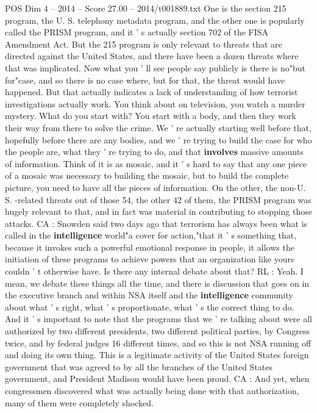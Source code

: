 \begin{textsample}{POS Dim 4 – 2014 – Score 27.00 – 2014/t001889.txt}
One is the section 215 program, the U.
S. telephony metadata program, and the other one is popularly called the PRISM program, and it ' s actually section 702 of the FISA Amendment Act.
But the 215 program is only relevant to threats that are directed against the United States, and there have been a dozen threats where that was implicated.
Now what you ' ll see people say publicly is there is no"but for"case, and so there is no case where, but for that, the threat would have happened.
But that actually indicates a lack of understanding of how terrorist investigations actually work.
You think about on television, you watch a murder mystery.
What do you start with?
You start with a body, and then they work their way from there to solve the crime.
We ' re actually starting well before that, hopefully before there are any bodies, and we ' re trying to build the case for who the people are, what they ' re trying to do, and that \textbf{involves} massive amounts of information.
Think of it is as mosaic, and it ' s hard to say that any one piece of a mosaic was necessary to building the mosaic, but to build the complete picture, you need to have all the pieces of information.
On the other, the non-U.
S. -related threats out of those 54, the other 42 of them, the PRISM program was hugely relevant to that, and in fact was material in contributing to stopping those attacks.
CA : Snowden said two days ago that terrorism has always been what is called in the \textbf{intelligence} world"a cover for action,"that it ' s something that, because it invokes such a powerful emotional response in people, it allows the initiation of these programs to achieve powers that an organization like yours couldn ' t otherwise have.
Is there any internal debate about that?
RL : Yeah.
I mean, we debate these things all the time, and there is discussion that goes on in the executive branch and within NSA itself and the \textbf{intelligence} community about what ' s right, what ' s proportionate, what ' s the correct thing to do.
And it ' s important to note that the programs that we ' re talking about were all authorized by two different presidents, two different political parties, by Congress twice, and by federal judges 16 different times, and so this is not NSA running off and doing its own thing.
This is a legitimate activity of the United States foreign government that was agreed to by all the branches of the United States government, and President Madison would have been proud.
CA : And yet, when congressmen discovered what was actually being done with that authorization, many of them were completely shocked.

\end{textsample}
